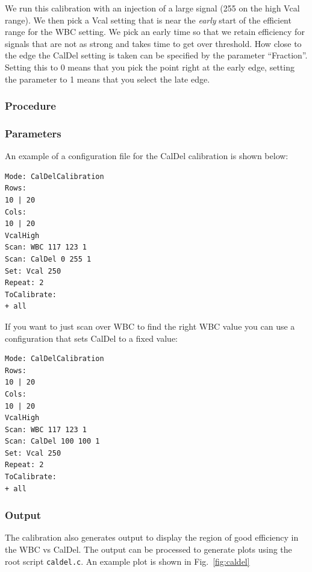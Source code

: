We run this calibration with an injection of a large signal (255 on the high Vcal range). We then pick a Vcal setting that is near the {\it early} start of the efficient range for the WBC setting. We pick an early time so that we retain efficiency for signals that are not as strong and takes time to get over  threshold. How close to the edge the CalDel setting  is taken can be specified by the parameter  ``Fraction''. Setting this to 0 means that you pick the point right at the early edge, setting the parameter to 1 means that you select the late edge. 

\subsubsection{Procedure}

\subsubsection{Parameters}
An example of a configuration file for the CalDel calibration is shown below:

\begin{verbatim}
Mode: CalDelCalibration
Rows:
10 | 20 
Cols:
10 | 20
VcalHigh
Scan: WBC 117 123 1
Scan: CalDel 0 255 1
Set: Vcal 250
Repeat: 2
ToCalibrate:
+ all
\end{verbatim}

If you want to just scan over WBC to find the right WBC value you can use a configuration that sets CalDel to a fixed value:

\begin{verbatim}
Mode: CalDelCalibration
Rows:
10 | 20
Cols:
10 | 20
VcalHigh
Scan: WBC 117 123 1
Scan: CalDel 100 100 1
Set: Vcal 250
Repeat: 2
ToCalibrate:
+ all
\end{verbatim}

\subsubsection{Output}
The calibration also generates output to display the region of good  efficiency in the WBC vs CalDel. The output can be processed to generate plots using the root script {\tt caldel.c}. An example plot is shown in  Fig.~\ref{fig:caldel}

